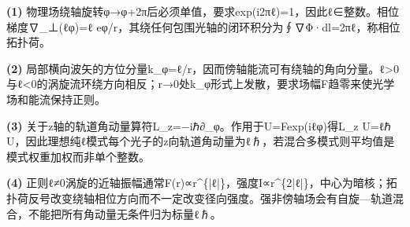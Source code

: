 \par\noindent\textbf{(1)} 物理场绕轴旋转φ→φ+2π后必须单值，要求exp(i2πℓ)=1，因此ℓ∈整数。相位梯度∇\_⊥(ℓφ)=ℓ eφ/r，其绕任何包围光轴的闭环积分为∮∇Φ·dl=2πℓ，称相位拓扑荷。
\par\noindent\textbf{(2)} 局部横向波矢的方位分量k\_φ=ℓ/r，因而傍轴能流可有绕轴的角向分量。ℓ>0与ℓ<0的涡旋流环绕方向相反；r→0处k\_φ形式上发散，要求场幅F趋零来使光学场和能流保持正则。
\par\noindent\textbf{(3)} 关于z轴的轨道角动量算符L\_z=−iℏ∂\_φ。作用于U=Fexp(iℓφ)得L\_z U=ℓℏ U，因此理想纯ℓ模式每个光子的z向轨道角动量为ℓℏ，若混合多模式则平均值是模式权重加权而非单个整数。
\par\noindent\textbf{(4)} 正则ℓ≠0涡旋的近轴振幅通常F(r)∝r\textasciicircum{}\{|ℓ|\}，强度I∝r\textasciicircum{}\{2|ℓ|\}，中心为暗核；拓扑荷反号改变绕轴相位方向而不一定改变径向强度。强非傍轴场会有自旋—轨道混合，不能把所有角动量无条件归为标量ℓℏ。
